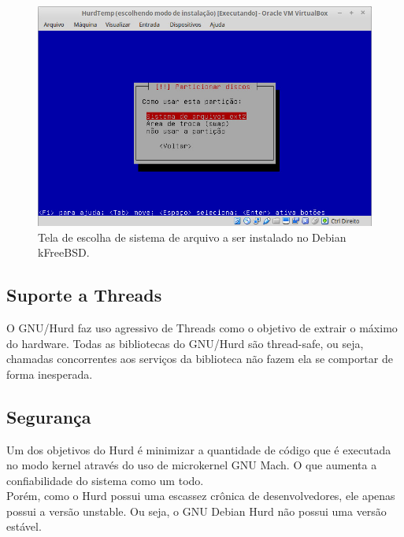 \documentclass[conference]{IEEEtran}
\begin{document}
\begin{figure}[h!]
	\centering
	\includegraphics[scale=0.35]{SistemasArquivosHurd.jpeg}
	\caption{Tela de escolha de sistema de arquivo a ser instalado no Debian kFreeBSD.}
	\label{fig:SisAqrLinux}
\end{figure}

\subsection{Suporte a Threads}\label{sec:HurdThreads}
O GNU/Hurd faz uso agressivo de Threads como o objetivo de extrair o máximo do hardware.\cite{Hurd} Todas as bibliotecas do GNU/Hurd são thread-safe, ou seja, chamadas concorrentes aos serviços da biblioteca não fazem ela se comportar de forma inesperada.

\subsection{Segurança}\label{sec:HurdSec}
Um dos objetivos do Hurd é minimizar a quantidade de código que é executada no modo kernel através do uso de microkernel GNU Mach. O que aumenta a confiabilidade do sistema como um todo.\\

Porém, como o Hurd possui uma escassez crônica de desenvolvedores, ele apenas possui a versão unstable. Ou seja, o GNU Debian Hurd não possui uma versão estável.



\end{document}
